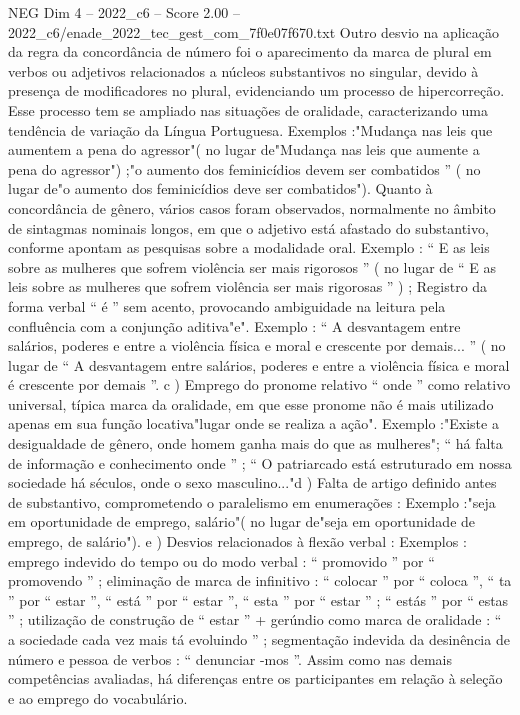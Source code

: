 \begin{textsample}{NEG Dim 4 – 2022\_c6 – Score 2.00 – 2022\_c6/enade\_2022\_tec\_gest\_com\_7f0e07f670.txt}
Outro desvio na aplicação da regra da concordância de número foi o aparecimento da marca de plural em verbos ou adjetivos relacionados a núcleos substantivos no singular, devido à presença de modificadores no plural, evidenciando um processo de hipercorreção.
Esse processo tem se ampliado nas situações de oralidade, caracterizando uma tendência de variação da Língua Portuguesa.
Exemplos :"Mudança nas leis que aumentem a pena do agressor"( no lugar de"Mudança nas leis que aumente a pena do agressor") ;"o aumento dos feminicídios devem ser combatidos ” ( no lugar de"o aumento dos feminicídios deve ser combatidos").
Quanto à concordância de gênero, vários casos foram observados, normalmente no âmbito de sintagmas nominais longos, em que o adjetivo está afastado do substantivo, conforme apontam as pesquisas sobre a modalidade oral.
Exemplo : “ E as leis sobre as mulheres que sofrem violência ser mais rigorosos ” ( no lugar de “ E as leis sobre as mulheres que sofrem violência ser mais rigorosas ” ) ; Registro da forma verbal “ é ” sem acento, provocando ambiguidade na leitura pela confluência com a conjunção aditiva"e".
Exemplo : “ A desvantagem entre salários, poderes e entre a violência física e moral e crescente por demais... ” ( no lugar de “ A desvantagem entre salários, poderes e entre a violência física e moral é crescente por demais ”. c ) Emprego do pronome relativo “ onde ” como relativo universal, típica marca da oralidade, em que esse pronome não é mais utilizado apenas em sua função locativa"lugar onde se realiza a ação".
Exemplo :"Existe a desigualdade de gênero, onde homem ganha mais do que as mulheres"; “ há falta de informação e conhecimento onde ” ; “ O patriarcado está estruturado em nossa sociedade há séculos, onde o sexo masculino..."d ) Falta de artigo definido antes de substantivo, comprometendo o paralelismo em enumerações : Exemplo :"seja em oportunidade de emprego, salário"( no lugar de"seja em oportunidade de emprego, de salário"). e ) Desvios relacionados à flexão verbal : Exemplos : emprego indevido do tempo ou do modo verbal : “ promovido ” por “ promovendo ” ; eliminação de marca de infinitivo : “ colocar ” por “ coloca ”, “ ta ” por “ estar ”, “ está ” por “ estar ”, “ esta ” por “ estar ” ; “ estás ” por “ estas ” ; utilização de construção de “ estar ” + gerúndio como marca de oralidade : “ a sociedade cada vez mais tá evoluindo ” ; segmentação indevida da desinência de número e pessoa de verbos : “ denunciar -mos ”.
Assim como nas demais competências avaliadas, há diferenças entre os participantes em relação à seleção e ao emprego do vocabulário.

\end{textsample}
